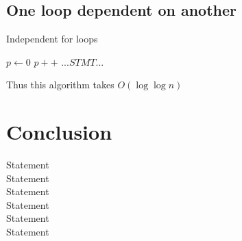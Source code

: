 \documentclass{article}
\begin{document}
\subsection{One loop dependent on another}
\begin{algorithm}[H]
    \caption{Independent for loops}\label{simple_for}
    \begin{algorithmic}
        \State $p \gets 0$
            \State $p++$ 
        \EndFor
            \State $...STMT...$ 
        \EndFor
    \end{algorithmic}
\end{algorithm}
\noindent
Thus this algorithm takes $O(\log{\log{n}})$

\section{Conclusion}
\begin{algorithm}[H]
    \begin{algorithmic}
        \State Statement 
        \EndFor\\
        \State Statement 
        \EndFor\\
        \State Statement 
        \EndFor\\
        \State Statement 
        \EndFor\\
        \State Statement 
        \EndFor\\
        \State Statement 
        \EndFor\\
    \end{algorithmic}
\end{algorithm}
\end{document}

